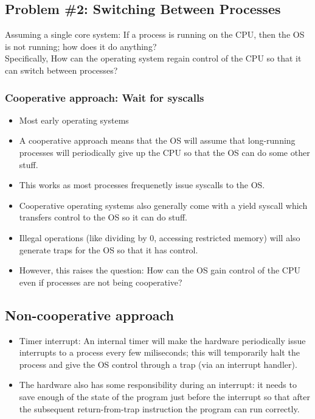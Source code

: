 \documentclass[11pt, a4paper]{article}
\theoremstyle{definition}
\theoremstyle{remark}
\begin{document}
\subsection{Problem \#2: Switching Between Processes} 
Assuming a single core system: If a process is running on the CPU, then the OS is not running; how does it do anything?\\
Specifically, How can the operating system regain control of the CPU so that it can switch between processes?
\subsubsection{Cooperative approach: Wait for syscalls}
\begin{itemize}
  \item Most early operating systems
  \item A cooperative approach means that the OS will assume that long-running processes will periodically give up the CPU so that the OS can do some other stuff.
  \item This works as most processes frequenetly issue syscalls to the OS. 
  \item Cooperative operating systems also generally come with a yield syscall which transfers control to the OS so it can do stuff.
  \item Illegal operations (like dividing by 0, accessing restricted memory) will also generate traps for the OS so that it has control.
  \item However, this raises the question: How can the OS gain control of the CPU even if processes are not being cooperative?
\end{itemize}
\subsection{Non-cooperative approach}
\begin{itemize}
  \item Timer interrupt: An internal timer will make the hardware periodically issue interrupts to a process every few miliseconds; this will temporarily halt the process and give the OS control through a trap (via an interrupt handler).
  \item The hardware also has some responsibility during an interrupt: it needs to save enough of the state of the program just before the interrupt so that after the subsequent return-from-trap instruction the program can run correctly.
\end{itemize}
\end{document}
